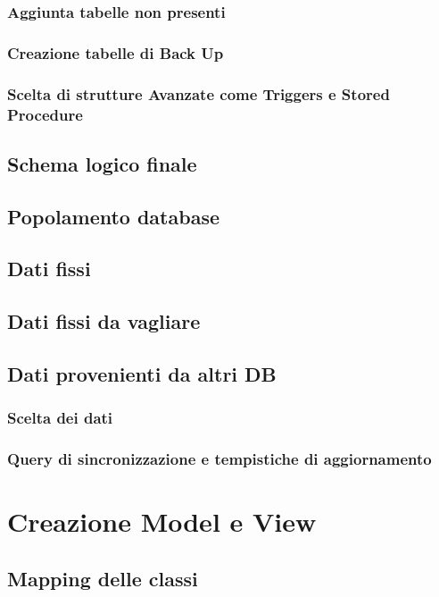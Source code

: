 \documentclass[12pt, a4paper]{article}
\begin{document}
\subsubsection{Aggiunta tabelle non presenti}
\subsubsection{Creazione tabelle di Back Up}
\subsubsection{Scelta di strutture Avanzate come Triggers e Stored Procedure}

\subsection{Schema logico finale}
\subsection{Popolamento database}
\subsection{Dati fissi}
\subsection{Dati fissi da vagliare}
\subsection{Dati provenienti da altri DB}
\subsubsection{Scelta dei dati}
\subsubsection{Query di sincronizzazione e tempistiche di aggiornamento}

% 
% 
\newpage
\section{Creazione Model e View}
\subsection{Mapping delle classi}
\end{document}
